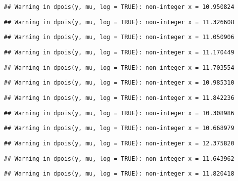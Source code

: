 \documentclass[
]{article}
\begin{document}
\begin{verbatim}
## Warning in dpois(y, mu, log = TRUE): non-integer x = 10.950824
\end{verbatim}

\begin{verbatim}
## Warning in dpois(y, mu, log = TRUE): non-integer x = 11.326608
\end{verbatim}

\begin{verbatim}
## Warning in dpois(y, mu, log = TRUE): non-integer x = 11.050906
\end{verbatim}

\begin{verbatim}
## Warning in dpois(y, mu, log = TRUE): non-integer x = 11.170449
\end{verbatim}

\begin{verbatim}
## Warning in dpois(y, mu, log = TRUE): non-integer x = 11.703554
\end{verbatim}

\begin{verbatim}
## Warning in dpois(y, mu, log = TRUE): non-integer x = 10.985310
\end{verbatim}

\begin{verbatim}
## Warning in dpois(y, mu, log = TRUE): non-integer x = 11.842236
\end{verbatim}

\begin{verbatim}
## Warning in dpois(y, mu, log = TRUE): non-integer x = 10.308986
\end{verbatim}

\begin{verbatim}
## Warning in dpois(y, mu, log = TRUE): non-integer x = 10.668979
\end{verbatim}

\begin{verbatim}
## Warning in dpois(y, mu, log = TRUE): non-integer x = 12.375820
\end{verbatim}

\begin{verbatim}
## Warning in dpois(y, mu, log = TRUE): non-integer x = 11.643962
\end{verbatim}

\begin{verbatim}
## Warning in dpois(y, mu, log = TRUE): non-integer x = 11.820418
\end{verbatim}
\end{document}
